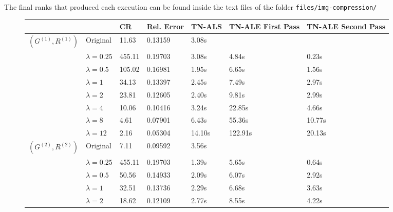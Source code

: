 \documentclass[11pt,a4paper,openright,oneside]{book}
\numberwithin{equation}{section}
\begin{document}
{The final ranks that produced each execution can be found inside the text files of the folder \verb|files/img-compression/|

\begin{figure}[h]
\begin{adjustwidth}{-30pt}{-30pt}
    \centering

\begin{tabular}{lllllll}
\hline
                     &                  & CR     & Rel. Error & TN-ALS & TN-ALE First Pass & TN-ALE Second Pass \\ \hline
$(G^{(1)}, R^{(1)})$ & Original         & 11.63  & 0.13159    & 3.08s  &                   &                    \\
                     & $\lambda = 0.25$ & 455.11 & 0.19703    & 3.08s  & 4.84s             & 0.23s              \\
                     & $\lambda = 0.5$  & 105.02 & 0.16981    & 1.95s  & 6.65s             & 1.56s              \\
                     & $\lambda = 1$    & 34.13  & 0.13397    & 2.45s  & 7.49s             & 2.97s              \\
                     & $\lambda = 2$    & 23.81  & 0.12605    & 2.40s  & 9.81s             & 2.99s              \\
                     & $\lambda = 4$    & 10.06  & 0.10416    & 3.24s  & 22.85s            & 4.66s              \\
                     & $\lambda = 8$    & 4.61   & 0.07901    & 6.43s  & 55.36s            & 10.77s             \\
                     & $\lambda = 12$   & 2.16   & 0.05304    & 14.10s & 122.91s           & 20.13s             \\ \hline
$(G^{(2)}, R^{(2)})$ & Original         & 7.11   & 0.09592    & 3.56s  &                   &                    \\
                     & $\lambda = 0.25$ & 455.11 & 0.19703    & 1.39s  & 5.65s             & 0.64s              \\
                     & $\lambda = 0.5$  & 50.56  & 0.14933    & 2.09s  & 6.07s             & 2.92s              \\
                     & $\lambda = 1$    & 32.51  & 0.13736    & 2.29s  & 6.68s             & 3.63s              \\
                     & $\lambda = 2$    & 18.62  & 0.12109    & 2.77s  & 8.55s             & 4.22s              \\

\end{tabular}
\end{adjustwidth}
\end{figure}}
\end{document}
